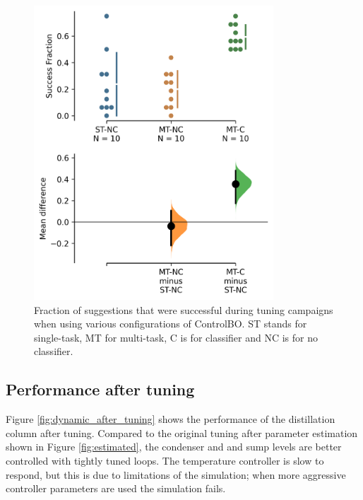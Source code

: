 \begin{figure}
    \centering
    \includegraphics[width=0.8\textwidth]{gfx/Chapter06/mean_diff_success_fraction.png}
    \caption{Fraction of suggestions that were successful during tuning campaigns when using various configurations of ControlBO. ST stands for single-task, MT for multi-task, C is for classifier and NC is for no classifier.}
    \label{fig:mean_diff_classifier}
\end{figure}


\subsection{Performance after tuning}

Figure \ref{fig:dynamic_after_tuning} shows the performance of the distillation column after tuning. Compared to the original tuning after parameter estimation shown in Figure \ref{fig:estimated}, the condenser and and sump levels are better controlled with tightly tuned loops. The temperature controller is slow to respond, but this is due to limitations of the simulation; when more aggressive controller parameters are used the simulation fails.

